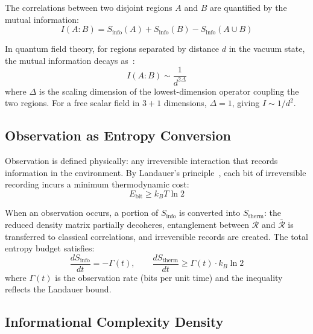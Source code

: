\documentclass[12pt,a4paper]{article}
\begin{document}
The correlations between two disjoint regions $A$ and $B$ are quantified by the mutual information:
\begin{equation}
    I(A:B) = S_{\mathrm{info}}(A) + S_{\mathrm{info}}(B) - S_{\mathrm{info}}(A \cup B)
\end{equation}

In quantum field theory, for regions separated by distance $d$ in the vacuum state, the mutual information decays as~\cite{Cardy2013,Calabrese2004}:
\begin{equation}
    I(A:B) \sim \frac{1}{d^{2\Delta}}
    \label{eq:mutual_info_decay}
\end{equation}
where $\Delta$ is the scaling dimension of the lowest-dimension operator coupling the two regions. For a free scalar field in $3+1$ dimensions, $\Delta = 1$, giving $I \sim 1/d^2$.

\subsection{Observation as Entropy Conversion}

Observation is defined physically: any irreversible interaction that records information in the environment. By Landauer's principle~\cite{Landauer1961}, each bit of irreversible recording incurs a minimum thermodynamic cost:
\begin{equation}
    E_{\mathrm{bit}} \geq k_B T \ln 2
    \label{eq:landauer}
\end{equation}

When an observation occurs, a portion of $S_{\mathrm{info}}$ is converted into $S_{\mathrm{therm}}$: the reduced density matrix partially decoheres, entanglement between $\mathcal{R}$ and $\bar{\mathcal{R}}$ is transferred to classical correlations, and irreversible records are created. The total entropy budget satisfies:
\begin{equation}
    \frac{dS_{\mathrm{info}}}{dt} = -\Gamma(t), \qquad \frac{dS_{\mathrm{therm}}}{dt} \geq \Gamma(t) \cdot k_B \ln 2
    \label{eq:conversion}
\end{equation}
where $\Gamma(t)$ is the observation rate (bits per unit time) and the inequality reflects the Landauer bound.

\subsection{Informational Complexity Density}
\end{document}
